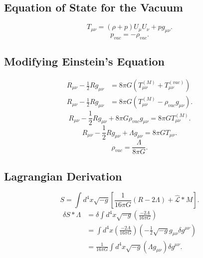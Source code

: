 \documentclass[11pt, a4paper]{report}
\begin{document}
\subsection{Equation of State for the Vacuum}
\begin{equation}
T_{\mu\nu} = (\rho + p)U_{\mu}U_{\nu} + p g_{\mu\nu}.
\end{equation}
\begin{equation}
\label{eq:vac_pressure}
p_{vac} = -\rho_{vac}.
\end{equation}

\subsection{Modifying Einstein's Equation}
\begin{align}
R_{\mu\nu} - \frac{1}{2}R g_{\mu\nu} &= 8\pi G \left( T_{\mu\nu}^{(M)} + T_{\mu\nu}^{(vac)} \right) \nonumber \\
R_{\mu\nu} - \frac{1}{2}R g_{\mu\nu} &= 8\pi G \left( T_{\mu\nu}^{(M)} - \rho_{vac} g_{\mu\nu} \right).
\end{align}
\begin{equation}
\label{eq:einstein_with_vac}
R_{\mu\nu} - \frac{1}{2}R g_{\mu\nu} + 8\pi G \rho_{vac} g_{\mu\nu} = 8\pi G T_{\mu\nu}^{(M)}.
\end{equation}
\begin{equation}
\label{eq:einstein_lambda}
R_{\mu\nu} - \frac{1}{2}R g_{\mu\nu} + \Lambda g_{\mu\nu} = 8\pi G T_{\mu\nu}.
\end{equation}
\begin{equation}
\rho_{vac} = \frac{\Lambda}{8\pi G}.
\end{equation}

\subsection{Lagrangian Derivation}
\begin{equation}
\label{eq:action_lambda}
S = \int d^4x \sqrt{-g} \left[ \frac{1}{16\pi G} (R - 2\Lambda) + \hat{\mathcal{L}}*M \right].
\end{equation}
\begin{align}
\delta S*{\Lambda} &= \delta \int d^4x \sqrt{-g} \left( \frac{-2\Lambda}{16\pi G} \right) \nonumber \\
&= \int d^4x \left( \frac{-2\Lambda}{16\pi G} \right) \left( -\frac{1}{2}\sqrt{-g}g_{\mu\nu}\delta g^{\mu\nu} \right) \nonumber \\
&= \frac{1}{16\pi G} \int d^4x \sqrt{-g} \left( \Lambda g_{\mu\nu} \right) \delta g^{\mu\nu}.
\end{align}
\end{document}
